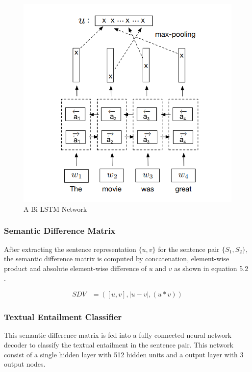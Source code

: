 \documentclass[12pt]{report} %
\begin{document}
	\begin{figure}[!tbp]
		\centering
		\includegraphics[scale=0.50]{image/Bi-LSTM.png}
		\caption{A Bi-LSTM Network \citep{conneau2017supervised}}
		\label{bilstm}
	\end{figure}
	
	\subsubsection{Semantic Difference Matrix}
	
	After extracting the sentence representation $\{u,v\}$  for the sentence pair $\{S_{1},S_{2}\}$, the semantic difference matrix is computed by concatenation, element-wise product and absolute element-wise difference of $u$ and $v$ as shown in equation 5.2 .
	
	\begin{align} 
	SDV & =([u,v],|u - v|,(u \ast v)) 
	\end{align}
	
	\subsubsection{Textual Entailment Classifier}
	
	This semantic difference matrix is fed into a fully connected neural network decoder to classify the textual entailment in the sentence pair. This network consist of a single hidden layer with 512 hidden units and a output layer with 3 output nodes. 
	
\end{document}
